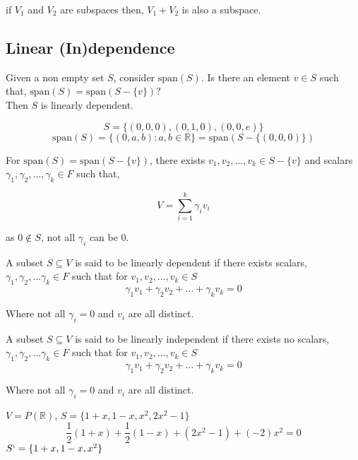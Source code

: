\documentclass[11pt,a4paper]{colorart}
\def\l{\left}
\def\r{\right}
\def\R{\mathbb{R}}
\def\g{\gamma}
\begin{document}
\begin{remark}
	if $V_1$ and $V_2$ are subspaces then, $V_1+V_2$ is also a subspace.
\end{remark}

\subsection{Linear (In)dependence}

Given a non empty set $S$, consider $\text{span}\l(S\r)$. Is there an element $v\in S$ such that, $\text{span}\l(S\r) = \text{span}\l(S-\{v\}\r)$?\\

Then $S$ is linearly dependent.

\begin{example}
	\[ S = \{\l(0,0,0\r),\l(0,1,0\r),\l(0,0,e\r)\} \]
	\[ \text{span}\l(S\r) = \{\l(0,a,b\r): a,b\in\R\} = \text{span}\l(S-\{\l(0,0,0\r)\}\r)\]
\end{example}

For $\text{span}\l(S\r) = \text{span}\l(S-\{v\}\r)$, there exists $v_1,v_2, \dots,v_k \in S -\{v\}$ and scalars $\g_1,\g_2,\dots,\g_k \in F$ such that,

\[ V = \sum_{i=1}^k \g_i v_i \]

as $0\notin S$, not all $\g_i$ can be $0$.

\begin{definition}
	A subset $S\subseteq V$ is said to be linearly dependent if there exists scalars, $\g_1,\g_2,\dots\g_k\in F$ such that for $v_1,v_2,\dots,v_k\in S$
	\[\g_1 v_1 + \g_2 v_2 + \dots + \g_k v_k = 0 \]

	Where not all $\g_i = 0$ and $v_i$ are all distinct.
\end{definition}

\begin{definition}
	A subset $S\subseteq V$ is said to be linearly independent if there exists no scalars, $\g_1,\g_2,\dots\g_k\in F$ such that for $v_1,v_2,\dots,v_k\in S$
	\[\g_1 v_1 + \g_2 v_2 + \dots + \g_k v_k = 0 \]

	Where not all $\g_i = 0$ and $v_i$ are all distinct.
\end{definition}

\begin{example}
	$V = P\l(\R\r) $, $S=\{1+x,1-x,x^2,2x^2-1\}$
	\[ \frac{1}{2} \l(1+x\r) + \frac{1}{2}\l(1-x\r) + \l(2x^2-1\r) + \l(-2\r)x^2 = 0 \]
	$S` =\{1+x,1-x,x^2\}$
\end{example}
\end{document}
